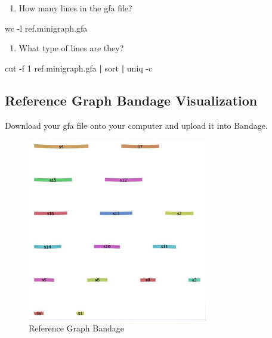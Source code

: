 \documentclass[
]{book}
\newenvironment{Shaded}{\begin{snugshade}}{\end{snugshade}}
\newcommand{\AttributeTok}[1]{\textcolor[rgb]{0.77,0.63,0.00}{#1}}
\newcommand{\FunctionTok}[1]{\textcolor[rgb]{0.00,0.00,0.00}{#1}}
\newcommand{\KeywordTok}[1]{\textcolor[rgb]{0.13,0.29,0.53}{\textbf{#1}}}
\newcommand{\NormalTok}[1]{#1}
\providecommand{\tightlist}{%
  \setlength{\itemsep}{0pt}\setlength{\parskip}{0pt}}
\begin{document}
\begin{enumerate}
\def\labelenumi{\arabic{enumi}.}
\setcounter{enumi}{1}
\tightlist
\item
  How many lines in the gfa file?
\end{enumerate}

\begin{Shaded}
\begin{Highlighting}[]
\FunctionTok{wc} \AttributeTok{{-}l}\NormalTok{ ref.minigraph.gfa}
\end{Highlighting}
\end{Shaded}

\begin{enumerate}
\def\labelenumi{\arabic{enumi}.}
\setcounter{enumi}{2}
\tightlist
\item
  What type of lines are they?
\end{enumerate}

\begin{Shaded}
\begin{Highlighting}[]
\FunctionTok{cut} \AttributeTok{{-}f}\NormalTok{ 1 ref.minigraph.gfa }\KeywordTok{|} \FunctionTok{sort} \KeywordTok{|} \FunctionTok{uniq} \AttributeTok{{-}c}
\end{Highlighting}
\end{Shaded}

\hypertarget{reference-graph-bandage-visualization}{%
\subsection*{Reference Graph Bandage Visualization}\label{reference-graph-bandage-visualization}}

Download your gfa file onto your computer and upload it into Bandage.

\begin{figure}
\centering
\includegraphics[width=0.7\textwidth,height=\textheight]{./Figures/Bandage2.png}
\caption{Reference Graph Bandage}
\end{figure}
\end{document}
